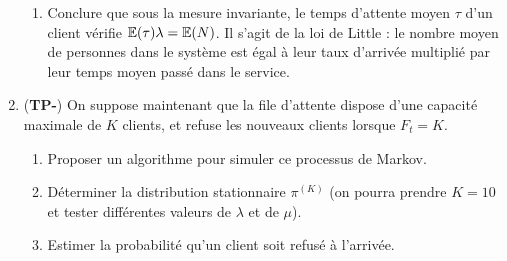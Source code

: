 \documentclass[]{exercices}
\begin{document}
\begin{exercice}
\begin{enumerate}
\begin{enumerate}
   \item Conclure que sous la mesure invariante, le temps d'attente moyen $\tau$ d'un client vérifie $\mathbb{E}(\tau) \lambda  = \mathbb{E}(N)$. Il s'agit de la loi de Little : le nombre moyen de personnes dans le système est égal à leur taux d'arrivée multiplié par leur temps moyen passé dans le service.
 \end{enumerate}
 \item (\textbf{TP-}) On suppose maintenant que la file d'attente dispose d'une capacité maximale de $K$ clients, et refuse les nouveaux clients lorsque $F_t = K$.
 \begin{enumerate}
   \item Proposer un algorithme pour simuler ce processus de Markov.
   \item Déterminer la distribution stationnaire $\pi^{(K)}$ (on pourra prendre $K=10$ et tester différentes valeurs de $\lambda$ et de $\mu$).
   \item Estimer la probabilité qu'un client soit refusé à l'arrivée.
 \end{enumerate}
\end{enumerate}
\end{exercice}
\end{document}
